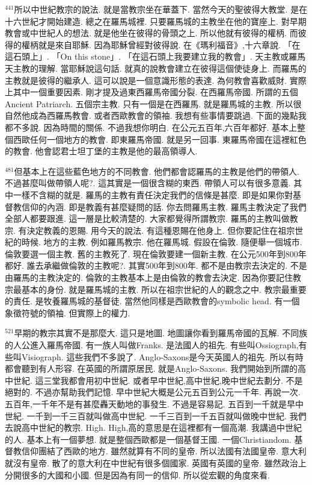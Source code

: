 \documentclass{book}
\begin{document}
$^{441}$所以中世紀教宗的說法.
就是當教宗坐在華蓋下.
當然今天的聖彼得大教堂.
是在十六世紀才開始建造.
總之在羅馬城裡.
只要羅馬城的主教坐在他的寶座上.
對早期教會或中世紀人的想法.
就是他坐在彼得的骨頭之上.
所以他就有彼得的權柄.
而彼得的權柄就是來自耶穌.
因為耶穌曾經對彼得說.
在《瑪利福音》,十六章說.
「在這石頭上」.
「On this stone」.
「在這石頭上我要建立我的教會」.
天主教或羅馬天主教的理解.
當耶穌說這句話.
就真的說教會建立在彼得這個使徒身上.
而羅馬的主教就是彼得的繼承人.
這可以說是一個意識形態的表達.
為何教會喜歡威財.
實際上其中一個重要因素.
剛才提及過東西羅馬帝國分裂.
在西羅馬帝國.
所謂的五個Ancient Patriarch.
五個宗主教.
只有一個是在西羅馬.
就是羅馬城的主教.
所以很自然他成為西羅馬教會.
或者西歐教會的領袖.
我想有些事情要跳過.
下面的幾點我都不多說.
因為時間的關係.
不過我想你明白.
在公元五百年,六百年都好.
基本上整個西歐任何一個地方的教會.
即東羅馬帝國.
就是另一回事.
東羅馬帝國在這裡紅色的教會.
他會認君士坦丁堡的主教是他的最高領導人.

$^{481}$但基本上在這些藍色地方的不同教會.
他們都會認羅馬的主教是他們的帶領人.
不過甚麼叫做帶領人呢?.
這其實是一個很含糊的東西.
帶領人可以有很多意義.
其中一樣不含糊的就是.
羅馬的主教有責任決定我們的信條是甚麼.
即是如果你對基督教信仰的內涵.
即是教義有甚麼疑問的話.
你去問羅馬主教.
羅馬主教決定了我們全部人都要跟進.
這一層是比較清楚的.
大家都覺得所謂教宗.
羅馬的主教叫做教宗.
有決定教義的恩賜.
用今天的說法.
有這種恩賜在他身上.
但你要記住在祖宗世紀的時候.
地方的主教.
例如羅馬教宗.
他在羅馬城.
假設在倫敦.
隨便舉一個城市.
倫敦要選一個主教.
舊的主教死了.
現在倫敦要建一個新主教.
在公元500年到800年都好.
誰去承繼做倫敦的主教呢?.
其實500年到800年.
都不是由教宗去決定的.
不是由羅馬的主教決定的.
倫敦的主教基本上是由倫敦的教會去決定.
因為你要記住教宗最基本的身份.
就是羅馬城的主教.
所以在祖宗世紀的人的觀念之中.
教宗最重要的責任.
是牧養羅馬城的基督徒.
當然他同樣是西歐教會的symbolic head.
有一個象徵符號的領袖.
但實際上的權力.

$^{521}$早期的教宗其實不是那麼大.
這只是地圖.
地圖讓你看到羅馬帝國的瓦解.
不同族的人公進入羅馬帝國.
有一族人叫做Franks.
是法國人的祖先.
有些叫Ossiograph,有些叫Visiograph.
這些我們不多說了.
Anglo-Saxons是今天英國人的祖先.
所以有時都會聽到有人形容.
在英國的所謂原居民.
就是Anglo-Saxons.
我們開始到所謂的高中世紀.
這三堂我都會用初中世紀.
或者早中世紀,高中世紀,晚中世紀去劃分.
不是絕對的.
不過亦幫助我們記憶.
早中世紀大概是公元五百到公元一千年.
再說一次.
五百年,一千年不是有甚麼轟天動地的事發生.
不過是容易記.
五百到一千就是早中世紀.
一千到一千三百就叫做高中世紀.
一千三百到一千五百就叫做晚中世紀.
我們去說高中世紀的教宗.
High.
High,高的意思是在這裡都有一個高潮.
我講過中世紀的人.
基本上有一個夢想.
就是整個西歐都是一個基督王國.
一個Christiandom.
基督教信仰團結了西歐的地方.
雖然就算有不同的皇帝.
所以法國有法國皇帝.
意大利就沒有皇帝.
散了的意大利在中世紀有很多個國家.
英國有英國的皇帝.
雖然政治上分開很多的大國和小國.
但是因為有同一的信仰.
所以從宏觀的角度來看.
\end{document}

